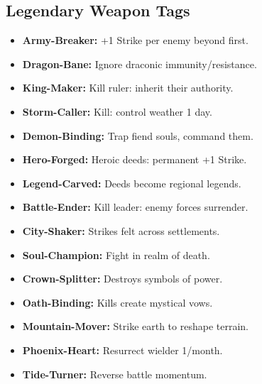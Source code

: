 \documentclass[10pt,twoside]{article}
\begin{document}
\vspace{0.5cm}

\subsection{Legendary Weapon Tags}
\begin{minipage}[t]{0.48\textwidth}
\begin{itemize}[leftmargin=0.3cm, itemsep=0.1cm]
\item \textcolor{legendarycolor}{\textbf{Army-Breaker:}} \textcolor{legendarycolor}{+1 Strike per enemy beyond first.}
\item \textcolor{legendarycolor}{\textbf{Dragon-Bane:}} \textcolor{legendarycolor}{Ignore draconic immunity/resistance.}
\item \textcolor{legendarycolor}{\textbf{King-Maker:}} \textcolor{legendarycolor}{Kill ruler: inherit their authority.}
\item \textcolor{legendarycolor}{\textbf{Storm-Caller:}} \textcolor{legendarycolor}{Kill: control weather 1 day.}
\item \textcolor{legendarycolor}{\textbf{Demon-Binding:}} \textcolor{legendarycolor}{Trap fiend souls, command them.}
\item \textcolor{legendarycolor}{\textbf{Hero-Forged:}} \textcolor{legendarycolor}{Heroic deeds: permanent +1 Strike.}
\item \textcolor{legendarycolor}{\textbf{Legend-Carved:}} \textcolor{legendarycolor}{Deeds become regional legends.}
\item \textcolor{legendarycolor}{\textbf{Battle-Ender:}} \textcolor{legendarycolor}{Kill leader: enemy forces surrender.}
\item \textcolor{legendarycolor}{\textbf{City-Shaker:}} \textcolor{legendarycolor}{Strikes felt across settlements.}
\item \textcolor{legendarycolor}{\textbf{Soul-Champion:}} \textcolor{legendarycolor}{Fight in realm of death.}
\item \textcolor{legendarycolor}{\textbf{Crown-Splitter:}} \textcolor{legendarycolor}{Destroys symbols of power.}
\item \textcolor{legendarycolor}{\textbf{Oath-Binding:}} \textcolor{legendarycolor}{Kills create mystical vows.}
\item \textcolor{legendarycolor}{\textbf{Mountain-Mover:}} \textcolor{legendarycolor}{Strike earth to reshape terrain.}
\item \textcolor{legendarycolor}{\textbf{Phoenix-Heart:}} \textcolor{legendarycolor}{Resurrect wielder 1/month.}
\item \textcolor{legendarycolor}{\textbf{Tide-Turner:}} \textcolor{legendarycolor}{Reverse battle momentum.}
\end{itemize}
\end{minipage}
\end{document}
